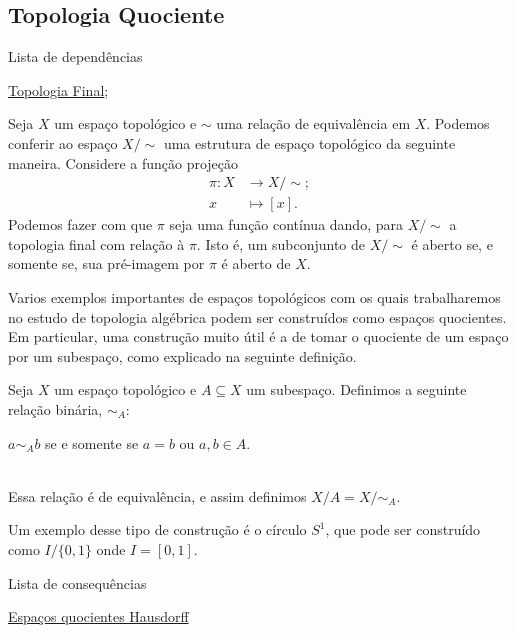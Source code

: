 \subsection{Topologia Quociente}
\label{topologia-quociente-def}
\begin{titlemize}{Lista de dependências}
	\item \hyperref[topologia-final]{Topologia Final}; 
\end{titlemize}
\begin{defi}
	Seja \(X\) um espaço topológico e \(\sim\) uma relação de equivalência em \(X\).
	Podemos conferir ao espaço \(X/\sim\) uma estrutura de espaço topológico da seguinte maneira. Considere a função projeção
	\begin{align*}
		\pi:X&\to X/\sim;\\
		x&\mapsto [x].
	\end{align*}
	Podemos fazer com que \(\pi\) seja uma função contínua dando, para \(X/\sim\) a topologia final com relação à \(\pi\). Isto é, um subconjunto de \(X/\sim\) é aberto se, e somente se, sua pré-imagem por $\pi$ é aberto de \(X\).  
\end{defi}

Varios exemplos importantes de espaços topológicos com os quais trabalharemos no estudo de topologia algébrica podem ser construídos como espaços quocientes. Em particular, uma construção muito útil é a de tomar o quociente de um espaço por um subespaço, como explicado na seguinte definição.
\begin{defi}
	Seja \(X\) um espaço topológico e \(A \subseteq X\) um subespaço. Definimos a seguinte relação binária, \(\sim_A\):\\
    \centerline{
	\(a\sim_A b\) se e somente se \(a=b\) ou \(a,b\in A\).}\\ Essa relação é de equivalência, e assim definimos \(X/A = X/\sim_A\). 
\end{defi}
Um exemplo desse tipo de construção é o círculo \(S^1\), que pode ser construído como \(I/\{0,1\}\) onde \(I=[0,1]\). 
\begin{titlemize}{Lista de consequências}
    \item
	\item \hyperref[topologia-quociente-hausdorff-thm]{Espaços quocientes Hausdorff}
\end{titlemize}


